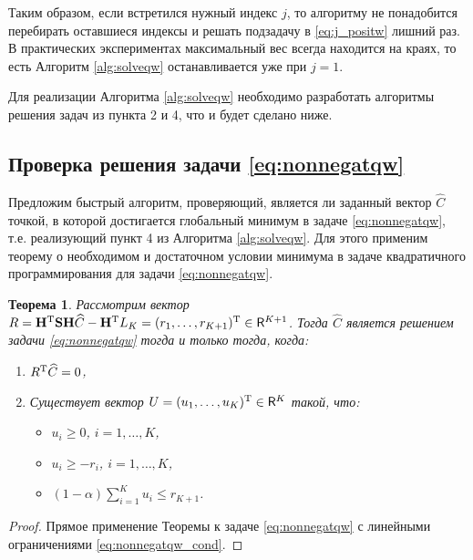 \documentclass[10pt]{article}
\newtheorem{theorem}{Теорема}
\begin{document}
Таким образом, если встретился нужный индекс $j$, то алгоритму не понадобится перебирать оставшиеся индексы и решать подзадачу в \eqref{eq:j_positw} лишний раз. В практических экспериментах максимальный вес всегда находится на краях, то есть Алгоритм \ref{alg:solveqw} останавливается уже при $j = 1$.

Для реализации Алгоритма \ref{alg:solveqw} необходимо разработать алгоритмы решения задач из пункта 2 и 4, что и будет сделано ниже.

\subsection{Проверка решения задачи \eqref{eq:nonnegatqw}}
Предложим быстрый алгоритм, проверяющий, является ли заданный вектор $\widehat C$ точкой, в которой достигается глобальный минимум в задаче \eqref{eq:nonnegatqw}, т.е. реализующий пункт 4 из Алгоритма \ref{alg:solveqw}. Для этого применим теорему о необходимом и достаточном условии минимума в задаче квадратичного программирования для задачи \eqref{eq:nonnegatqw}.
\begin{theorem} \label{th:nonnegatfc}
	Рассмотрим вектор $R =  \mathbf{H}^{\mathrm{T}} \mathbf{S} \mathbf{H} \widehat C - \mathbf{H}^{\mathrm{T}} L_K = (r_1, \ldots, r_{K+1})^{\mathrm{T}} \in \mathsf{R}^{K+1}$. Тогда $\widehat C$ является решением задачи \eqref{eq:nonnegatqw} тогда и только тогда, когда:
	\begin{enumerate}
		\item $R^{\mathrm{T}} \widehat C = 0$,
		\item Существует вектор $U = (u_1, \ldots, u_K)^{\mathrm{T}} \in \mathsf{R}^K$ такой, что: \begin{itemize}
			\item $u_i \ge 0$, $i = 1, \ldots, K$,
			\item $u_i \ge -r_i$, $i = 1, \ldots, K$,
			\item $(1 - \alpha) \sum_{i=1}^K u_i \le r_{K+1}$.
		\end{itemize}
	\end{enumerate}
\end{theorem} 
\begin{proof}
	Прямое применение Теоремы  \cite[Теорема 9.2]{Gavurin1984} к задаче \eqref{eq:nonnegatqw} с линейными ограничениями \eqref{eq:nonnegatqw_cond}.
\end{proof}
\end{document}
